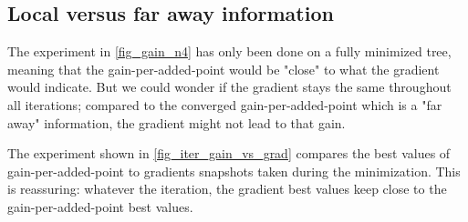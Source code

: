 \subsection{Local versus far away information}

The experiment in \cref{fig_gain_n4} has only been done on a fully minimized tree, meaning that the gain-per-added-point would be "close" to what the gradient would indicate. But we could wonder if the gradient stays the same throughout all iterations; compared to the converged gain-per-added-point which is a "far away" information, the gradient might not lead to that gain.

The experiment shown in \cref{fig_iter_gain_vs_grad} compares the best values of gain-per-added-point to gradients snapshots taken during the minimization. This is reassuring: whatever the iteration, the gradient best values keep close to the gain-per-added-point best values.

